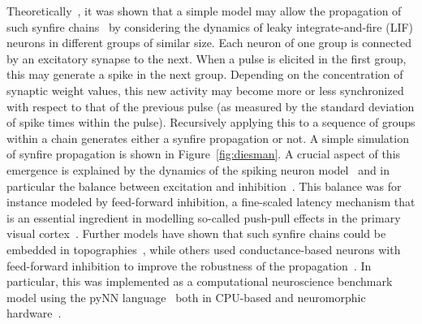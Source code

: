 \documentclass[brainsci, %
               review,submit,pdftex,moreauthors
               ]{Definitions/mdpi}
\begin{document}
Theoretically~\citep{deneve_bayesian_2004, ballard_dual_2011}, it was shown that a simple model may allow the propagation of such synfire chains~\citep{gewaltig_propagation_2001} by considering the dynamics of leaky integrate-and-fire (LIF) neurons in different groups of similar size. Each neuron of one group is connected by an excitatory synapse to the next. When a pulse is elicited in the first group, this may generate a spike in the next group. Depending on the concentration of synaptic weight values, this new activity may become more or less synchronized with respect to that of the previous pulse (as measured by the standard deviation of spike times within the pulse). Recursively applying this to a sequence of groups within a chain generates either a synfire propagation or not. A simple simulation of synfire propagation is shown in Figure~\ref{fig:diesman}. A crucial aspect of this emergence is explained by the dynamics of the spiking neuron model~\citep{gerstner_time_1995} and in particular the balance between excitation and inhibition~\citep{azouz_stimulus-selective_2008}. This balance was for instance modeled by feed-forward inhibition, a fine-scaled latency mechanism that is an essential ingredient in modelling so-called push-pull effects in the primary visual cortex~\citep{kremkow_push-pull_2016}. Further models have shown that such synfire chains could be embedded in topographies~\citep{aviel_embedding_2003}, while others used conductance-based neurons with feed-forward inhibition to improve the robustness of the propagation~\citep{kremkow_functional_2010}. In particular, this was implemented as a computational neuroscience benchmark model using the pyNN language~\citep{davison_pynn_2008} both in CPU-based and neuromorphic hardware~\citep{pfeil_six_2013}. %
%
\end{document}
